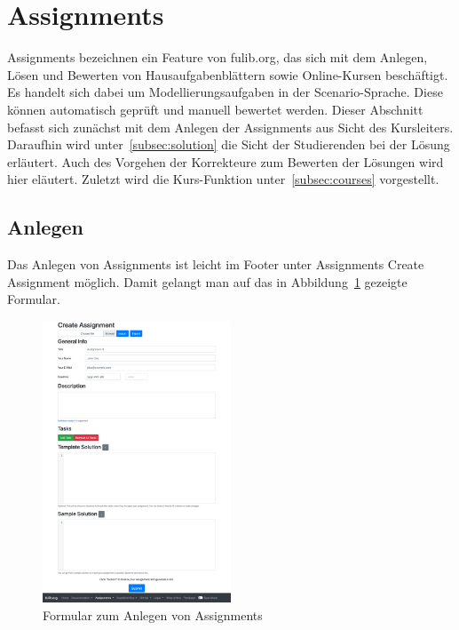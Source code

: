\section{Assignments}\label{sec:assignments}

Assignments bezeichnen ein Feature von fulib.org, das sich mit dem Anlegen, Lösen und Bewerten von Hausaufgabenblättern sowie Online-Kursen beschäftigt.
Es handelt sich dabei um Modellierungsaufgaben in der Scenario-Sprache.
Diese können automatisch geprüft und manuell bewertet werden.
Dieser Abschnitt befasst sich zunächst mit dem Anlegen der Assignments aus Sicht des Kursleiters.
Daraufhin wird unter~\ref{subsec:solution} die Sicht der Studierenden bei der Lösung erläutert.
Auch des Vorgehen der Korrekteure zum Bewerten der Lösungen wird hier eläutert.
Zuletzt wird die Kurs-Funktion unter~\ref{subsec:courses} vorgestellt.

\subsection{Anlegen}\label{subsec:creation}

Das Anlegen von Assignments ist leicht im Footer unter Assignments \textrightarrow Create Assignment möglich.
Damit gelangt man auf das in Abbildung~\ref{fig:create-assignment} gezeigte Formular.

\begin{figure}
    \centering
    \includegraphics[width=0.5\textwidth]{chapter/fulib.org/img/create-assignment.png}
    \caption{Formular zum Anlegen von Assignments}
    \label{fig:create-assignment}
\end{figure}

